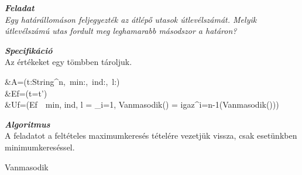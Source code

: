 \documentclass[12pt,a4paper]{article}			%
\newcommand{\fejezet}[1]{\noindent \textbf{\textit{\large #1 \vspace{5mm}}}}
\begin{document}
	
	\fejezet{Feladat}\\
	\textit{Egy határállomáson feljegyezték az átlépő utasok útlevélszámát. Melyik útlevélszámú
	utas fordult meg leghamarabb másodszor a határon?}
	\vspace{5mm}

	\fejezet{Specifikáció}\\
	Az értékeket egy tömbben tároljuk.
		\begin{flalign*}
			&A=(t:String^n,~min:\mathbb{N},~ind:,~l:)\\
			&Ef=(t=t')\\
			&Uf=(Ef~\wedge~min, ind, l = \min _{i=1, Vanmasodik() = igaz}^{i=n-1}(Vanmasodik()))
		\end{flalign*}
	
	\fejezet{Algoritmus}\\
	A feladatot a feltételes maximumkeresés tételére vezetjük vissza, csak esetünkben minimumkereséssel. \\
		\noindent\hfill
		\begin{stukibox}[6cm]
		\end{stukibox}
		\hfill
		\begin{stukibox}[4cm]
		\end{stukibox}
		\hfill{}

		\noindent\hfill
		\begin{stuki}[\textwidth]
			\begin{WHILE}{4}{}
				\begin{CASE}[1]{2}{6}
					\begin{IF}{1}{}
					\ELSE
					\end{IF}
				\end{CASE}
			\end{WHILE}
		\end{stuki}
		\begin{stuki*}{Vanmasodik} 
			\begin{WHILE}{2}{}
				\begin{IF}{1}{}
				\ELSE
				\end{IF}
			\end{WHILE}
		\end{stuki*}
		\vspace{5mm} 
	
\end{document}
